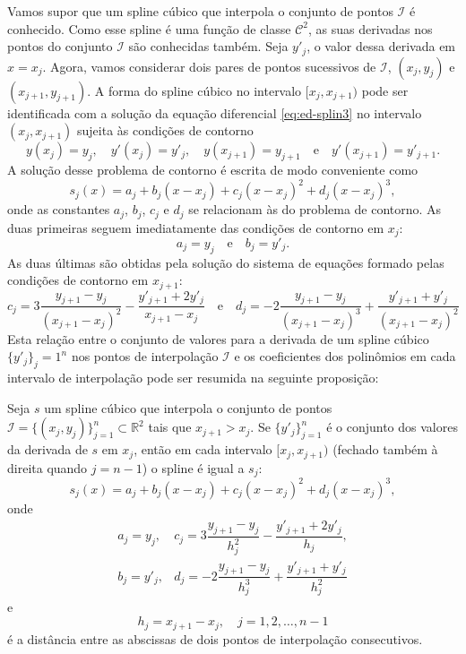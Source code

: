 Vamos supor que um spline cúbico que interpola o conjunto de pontos $\mathcal{I}$ é conhecido. Como esse spline é uma função de classe $\mathcal{C}^2$, as suas derivadas nos pontos do conjunto $\mathcal{I}$  são conhecidas também. Seja $y'_j$, o valor dessa derivada em $x=x_j$. Agora, vamos considerar dois pares de pontos sucessivos de $\mathcal{I}$,  $(x_j,y_j)$ e $(x_{j+1},y_{j+1})$. A forma do spline cúbico no intervalo $[x_j,x_{j+1})$ pode ser identificada com a solução da equação diferencial \eqref{eq:ed-splin3} no intervalo $(x_j,x_{j+1})$ sujeita às condições de contorno 
\begin{equation*}
y(x_j)=y_j,\quad y'(x_j)=y'_j,\quad y(x_{j+1})=y_{j+1}\quad\text{e}\quad y'(x_{j+1})=y'_{j+1}.
\end{equation*}
A solução desse problema de contorno é escrita de modo conveniente como
\begin{equation*}
s_j(x)=a_j+b_j(x-x_j)+c_j(x-x_j)^2+d_j(x-x_j)^3,
\end{equation*} 
onde as constantes $a_j$, $b_j$, $c_j$ e $d_j$ se relacionam às do problema de contorno.  As duas primeiras seguem imediatamente das condições de contorno em $x_j$:
\begin{equation*}
a_j=y_j\quad\text{e}\quad b_j=y'_j.
\end{equation*}
As duas últimas são obtidas pela solução do sistema de equações formado pelas condições de contorno em $x_{j+1}$:
\begin{equation*}
c_j=3\frac{y_{j+1}-y_j}{\left(x_{j+1}-x_j\right)^2}-\frac{y'_{j+1}+2y'_j}{x_{j+1}-x_j} \quad\text{e}\quad d_j=-2\frac{y_{j+1}-y_j}{\left(x_{j+1}-x_j\right)^3}+\frac{y'_{j+1}+y'_j}{\left(x_{j+1}-x_j\right)^2}
\end{equation*}
Esta relação entre o conjunto de valores para a derivada de um spline cúbico $\{y'_j\}_j=1^{n}$ nos pontos de interpolação $\mathcal{I}$ e os coeficientes dos polinômios em cada intervalo de interpolação pode ser resumida na seguinte proposição:
\begin{prop}
	Seja $s$ um spline cúbico que interpola o conjunto de pontos $\mathcal{I}=\{(x_j,y_j)\}_{j=1}^n\subset\mathbb{R}^2$ tais que $x_{j+1}>x_j$. Se $\{y'_j\}_{j=1}^n$ é o conjunto dos valores da derivada de $s$ em $x_j$, então em cada intervalo $[x_j,x_{j+1})$ (fechado também à direita quando $j=n-1$) o spline é igual a $s_j$:
	\begin{equation}\label{eq:spline3}
	s_j(x)=a_j+b_j(x-x_j)+c_j(x-x_j)^2+d_j(x-x_j)^3,
	\end{equation}
	onde
	\begin{equation}
	\begin{array}{ll}\label{eq:spline3-coef}
		a_j=y_j,&c_j=3\dfrac{y_{j+1}-y_j}{h_j^2}-\dfrac{y'_{j+1}+2y'_j}{h_j},\\
		b_j=y'_j,&d_j=-2\dfrac{y_{j+1}-y_j}{h_j^3}+\dfrac{y'_{j+1}+y'_j}{h_j^2}
	\end{array}
	\end{equation}
	e
	\begin{equation}\label{eq:espacamento}
		h_j=x_{j+1}-x_j,\quad j=1,2,\ldots,n-1
	\end{equation}
	é a distância entre as abscissas de dois pontos de interpolação consecutivos.
\end{prop}
